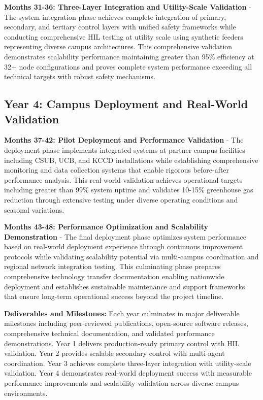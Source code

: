 \documentclass[12pt]{article}
\begin{document}
\textbf{Months 31-36: Three-Layer Integration and Utility-Scale Validation} - The system integration phase achieves complete integration of primary, secondary, and tertiary control layers with unified safety frameworks while conducting comprehensive HIL testing at utility scale using synthetic feeders representing diverse campus architectures. This comprehensive validation demonstrates scalability performance maintaining greater than 95\% efficiency at 32+ node configurations and proves complete system performance exceeding all technical targets with robust safety mechanisms.

\subsection{Year 4: Campus Deployment and Real-World Validation}

\textbf{Months 37-42: Pilot Deployment and Performance Validation} - The deployment phase implements integrated systems at partner campus facilities including CSUB, UCB, and KCCD installations while establishing comprehensive monitoring and data collection systems that enable rigorous before-after performance analysis. This real-world validation achieves operational targets including greater than 99\% system uptime and validates 10-15\% greenhouse gas reduction through extensive testing under diverse operating conditions and seasonal variations.

\textbf{Months 43-48: Performance Optimization and Scalability Demonstration} - The final deployment phase optimizes system performance based on real-world deployment experience through continuous improvement protocols while validating scalability potential via multi-campus coordination and regional network integration testing. This culminating phase prepares comprehensive technology transfer documentation enabling nationwide deployment and establishes sustainable maintenance and support frameworks that ensure long-term operational success beyond the project timeline.

\textbf{Deliverables and Milestones:} Each year culminates in major deliverable milestones including peer-reviewed publications, open-source software releases, comprehensive technical documentation, and validated performance demonstrations. Year 1 delivers production-ready primary control with HIL validation. Year 2 provides scalable secondary control with multi-agent coordination. Year 3 achieves complete three-layer integration with utility-scale validation. Year 4 demonstrates real-world deployment success with measurable performance improvements and scalability validation across diverse campus environments.
\end{document}
